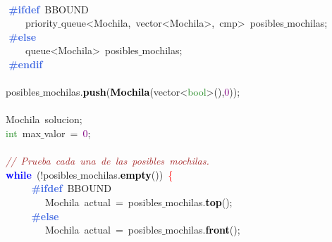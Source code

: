 \mbox{} \\
\mbox{}\textbf{\textcolor{RoyalBlue}{\ \ \ \ \#ifdef}}\ BBOUND \\
\mbox{}\ \ \ \ \ \ \ \ \textcolor{TealBlue}{priority$\_$queue\textless{}Mochila,\ vector\textless{}Mochila\textgreater{},\ cmp\textgreater{}}\ posibles$\_$mochilas\textcolor{BrickRed}{;} \\
\mbox{}\textbf{\textcolor{RoyalBlue}{\ \ \ \ \#else}} \\
\mbox{}\ \ \ \ \ \ \ \ \textcolor{TealBlue}{queue\textless{}Mochila\textgreater{}}\ posibles$\_$mochilas\textcolor{BrickRed}{;} \\
\mbox{}\textbf{\textcolor{RoyalBlue}{\ \ \ \ \#endif}} \\
\mbox{} \\
\mbox{}\ \ \ \ posibles$\_$mochilas\textcolor{BrickRed}{.}\textbf{\textcolor{Black}{push}}\textcolor{BrickRed}{(}\textbf{\textcolor{Black}{Mochila}}\textcolor{BrickRed}{(}vector\textcolor{BrickRed}{\textless{}}\textcolor{ForestGreen}{bool}\textcolor{BrickRed}{\textgreater{}(),}\textcolor{Purple}{0}\textcolor{BrickRed}{));} \\
\mbox{} \\
\mbox{}\ \ \ \ \textcolor{TealBlue}{Mochila}\ solucion\textcolor{BrickRed}{;} \\
\mbox{}\ \ \ \ \textcolor{ForestGreen}{int}\ max$\_$valor\ \textcolor{BrickRed}{=}\ \textcolor{Purple}{0}\textcolor{BrickRed}{;} \\
\mbox{} \\
\mbox{}\ \ \ \ \textit{\textcolor{Brown}{//\ Prueba\ cada\ una\ de\ las\ posibles\ mochilas.}} \\
\mbox{}\ \ \ \ \textbf{\textcolor{Blue}{while}}\ \textcolor{BrickRed}{(!}posibles$\_$mochilas\textcolor{BrickRed}{.}\textbf{\textcolor{Black}{empty}}\textcolor{BrickRed}{())}\ \textcolor{Red}{\{} \\
\mbox{}\textbf{\textcolor{RoyalBlue}{\ \ \ \ \ \ \ \ \#ifdef}}\ BBOUND \\
\mbox{}\ \ \ \ \ \ \ \ \ \ \ \ \textcolor{TealBlue}{Mochila}\ actual\ \textcolor{BrickRed}{=}\ posibles$\_$mochilas\textcolor{BrickRed}{.}\textbf{\textcolor{Black}{top}}\textcolor{BrickRed}{();} \\
\mbox{}\textbf{\textcolor{RoyalBlue}{\ \ \ \ \ \ \ \ \#else}} \\
\mbox{}\ \ \ \ \ \ \ \ \ \ \ \ \textcolor{TealBlue}{Mochila}\ actual\ \textcolor{BrickRed}{=}\ posibles$\_$mochilas\textcolor{BrickRed}{.}\textbf{\textcolor{Black}{front}}\textcolor{BrickRed}{();} \\
